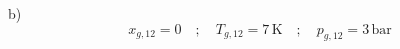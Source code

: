 b) \\
\[ x_{g,12} = 0 \quad ; \quad T_{g,12} = 7 \, \text{K} \quad ; \quad p_{g,12} = 3 \, \text{bar} \]